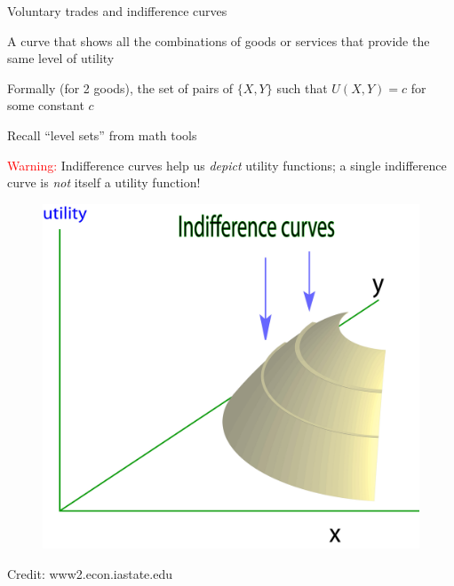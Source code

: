 \documentclass[table]{beamer}
\providecommand{\tightlist}{%
  \setlength{\itemsep}{0pt}\setlength{\parskip}{0pt}}
\begin{document}
\begin{frame}{Voluntary trades and indifference curves}
\protect\hypertarget{voluntary-trades-and-indifference-curves}{}

\begin{description}
\tightlist
\item[Indifference curve]
A curve that shows all the combinations of goods or services that
provide the same level of utility
\end{description}

\bigskip

Formally (for 2 goods), the set of pairs of \(\{X,Y\}\) such that
\(U(X,Y)=c\) for some constant \(c\)

\bigskip

Recall ``level sets'' from math tools

\textcolor{red}{Warning:} Indifference curves help us \emph{depict}
utility functions; a single indifference curve is \emph{not} itself a
utility function!

\end{frame}

\begin{frame}

\begin{figure}

{\centering \includegraphics[width=0.7\linewidth]{picsfigs/indifcurves_util_together} 

}

\end{figure}

Credit: www2.econ.iastate.edu

\end{frame}
\end{document}

